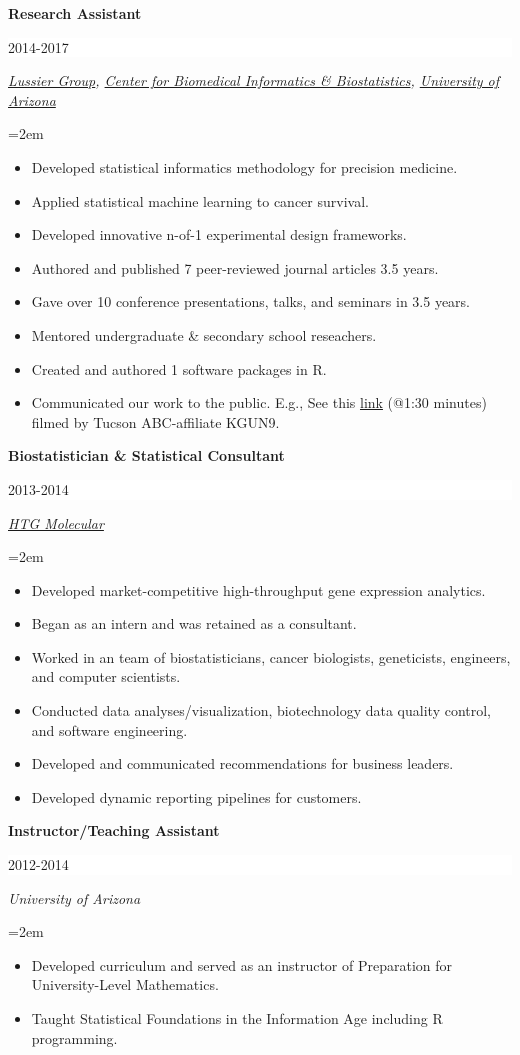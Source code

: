 \documentclass[paper=a4,fontsize=11pt]{scrartcl} %
\newcommand{\sepspace}{\vspace*{1em}}		%
\newcommand{\EducationEntry}[4]{
		\noindent \textbf{#1} \hfill      %
		\colorbox{White}{%
			\parbox{6em}{%
			\hfill\color{Black}#2}} \par  %
		\noindent \textit{#3} \par        %
		\noindent\hangindent=2em\hangafter=0 \small #4 %
		\normalsize \par \vspace{-7pt}}
\begin{document}
\EducationEntry{Research Assistant}{2014-2017}{{\href{http://lussierlab.org/}{Lussier Group}}, {\href{http://cb2.uahs.arizona.edu/}{Center for Biomedical Informatics \& Biostatistics}}, {\href{http://www.arizona.edu/}{University of Arizona}}}{
  \begin{itemize}
  \item Developed statistical informatics methodology for precision medicine.
  \item Applied statistical machine learning to cancer survival.
    \item Developed innovative n-of-1 experimental design frameworks.
    \item Authored and published 7 peer-reviewed journal articles 3.5 years.
    \item Gave over 10 conference presentations, talks, and seminars in 3.5 years.
    \item Mentored undergraduate \& secondary school reseachers.
    \item Created and authored 1 software packages in R.
      \item Communicated our work to the public. E.g., See this \href{http://cb2.uahs.arizona.edu/news/dr-lussier-and-grant-schissler-speak-big-data-kgun9-local-news}{link} (@1:30 minutes) filmed by Tucson ABC-affiliate KGUN9.
    \end{itemize}}
\sepspace

\vspace{-10pt}

\EducationEntry{Biostatistician \& Statistical Consultant}{2013-2014}{{\href{https://www.htgmolecular.com/}{HTG Molecular}}}{
  \begin{itemize}
  \item Developed market-competitive high-throughput gene expression analytics.
  \item Began as an intern and was retained as a consultant.
  \item Worked in an team of biostatisticians, cancer biologists, geneticists, engineers, and computer scientists.
  \item Conducted data analyses/visualization, biotechnology data quality control, and software engineering.
  \item Developed and communicated recommendations for business leaders.
    \item Developed dynamic reporting pipelines for customers.
\end{itemize}}
\sepspace

\EducationEntry{Instructor/Teaching Assistant}{2012-2014}{University of Arizona}{
\begin{itemize}
\item Developed curriculum and served as an instructor of Preparation for University-Level Mathematics.
  \item Taught Statistical Foundations in the Information Age including R programming.
  \end{itemize}}
\sepspace
\end{document}

